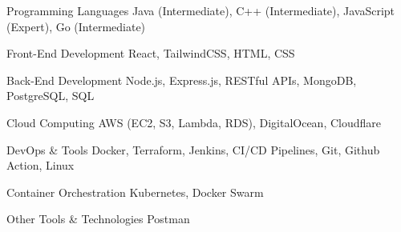
\begin{cvskills}

  \cvskill
    {Programming Languages} %
    {Java (Intermediate), C++ (Intermediate), JavaScript (Expert), Go (Intermediate)} %

  \cvskill
    {Front-End Development} %
    {React, TailwindCSS, HTML, CSS} %

  \cvskill
    {Back-End Development} %
    {Node.js, Express.js, RESTful APIs, MongoDB, PostgreSQL, SQL} %

  \cvskill
    {Cloud Computing} %
    {AWS (EC2, S3, Lambda, RDS), DigitalOcean, Cloudflare} %

  \cvskill
    {DevOps \& Tools} %
    {Docker, Terraform, Jenkins, CI/CD Pipelines, Git, Github Action, Linux} %

  \cvskill
    {Container Orchestration} %
    {Kubernetes, Docker Swarm} %

  \cvskill
    {Other Tools \& Technologies} %
    {Postman} %


\end{cvskills}
